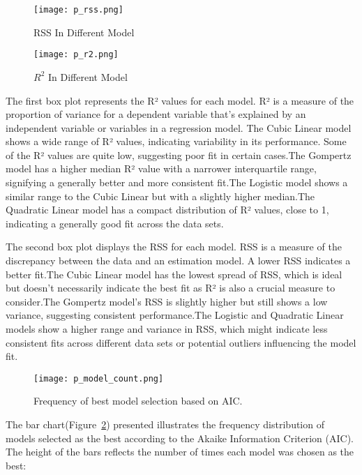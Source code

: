 \documentclass[11pt]{article}
\begin{document}
\begin{figure}[H]
  \centering
  \begin{minipage}{0.48\textwidth}
    \texttt{[image: p\_rss.png]}
    \caption{RSS In Different Model}
    \label{fig:image9}
  \end{minipage}
  \hfill
  \begin{minipage}{0.48\textwidth}
    \texttt{[image: p\_r2.png]}
    \caption{$R^2$ In Different Model}
    \label{fig:image10}
  \end{minipage}
\end{figure}
The first box plot represents the R² values for each model. R² is a measure of the proportion of variance for a dependent variable that's explained by an independent variable or variables in a regression model.
The Cubic Linear model shows a wide range of R² values, indicating variability in its performance. Some of the R² values are quite low, suggesting poor fit in certain cases.The Gompertz model has a higher median R² value with a narrower interquartile range, signifying a generally better and more consistent fit.The Logistic model shows a similar range to the Cubic Linear but with a slightly higher median.The Quadratic Linear model has a compact distribution of R² values, close to 1, indicating a generally good fit across the data sets.

The second box plot displays the RSS for each model. RSS is a measure of the discrepancy between the data and an estimation model. A lower RSS indicates a better fit.The Cubic Linear model has the lowest spread of RSS, which is ideal but doesn't necessarily indicate the best fit as R² is also a crucial measure to consider.The Gompertz model's RSS is slightly higher but still shows a low variance, suggesting consistent performance.The Logistic and Quadratic Linear models show a higher range and variance in RSS, which might indicate less consistent fits across different data sets or potential outliers influencing the model fit.
 

\begin{figure}[H]
\centering
\texttt{[image: p\_model\_count.png]} 
\caption{Frequency of best model selection based on AIC.}
\label{fig:bestmodelaic}
\end{figure}

The bar chart(Figure~\ref{fig:bestmodelaic}) presented illustrates the frequency distribution of models selected as the best according to the Akaike Information Criterion (AIC). The height of the bars reflects the number of times each model was chosen as the best:
\end{document}
